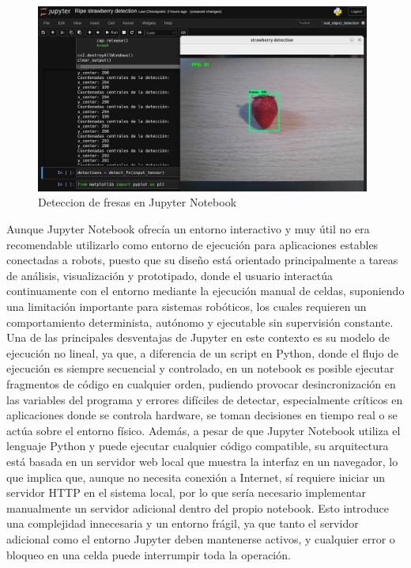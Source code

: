   \begin{figure}[H]
     \centering
     \begin{center}
       \includegraphics[width=11cm]{figs/Coordenadas centrales deteccion JN.png}
     \end{center}
     \caption{Deteccion de fresas en Jupyter Notebook}
    \label{fig:Coord_JN}
  \end{figure}

Aunque Jupyter Notebook ofrecía un entorno interactivo y muy útil no era recomendable utilizarlo como entorno de ejecución para aplicaciones estables conectadas a robots, puesto que su diseño está orientado principalmente a tareas de análisis, visualización y prototipado, donde el usuario interactúa continuamente con el entorno mediante la ejecución manual de celdas, suponiendo una limitación importante para sistemas robóticos, los cuales requieren un comportamiento determinista, autónomo y ejecutable sin supervisión constante. Una de las principales desventajas de Jupyter en este contexto es su modelo de ejecución no lineal, ya que, a diferencia de un script en Python, donde el flujo de ejecución es siempre secuencial y controlado, en un notebook es posible ejecutar fragmentos de código en cualquier orden, pudiendo provocar desincronización en las variables del programa y errores difíciles de detectar, especialmente críticos en aplicaciones donde se controla hardware, se toman decisiones en tiempo real o se actúa sobre el entorno físico. Además, a pesar de que Jupyter Notebook utiliza el lenguaje Python y puede ejecutar cualquier código compatible, su arquitectura está basada en un servidor web local que muestra la interfaz en un navegador, lo que implica que, aunque no necesita conexión a Internet, sí requiere iniciar un servidor HTTP en el sistema local, por lo que sería necesario implementar manualmente un servidor adicional dentro del propio notebook. Esto introduce una complejidad innecesaria y un entorno frágil, ya que tanto el servidor adicional como el entorno Jupyter deben mantenerse activos, y cualquier error o bloqueo en una celda puede interrumpir toda la operación.\\


